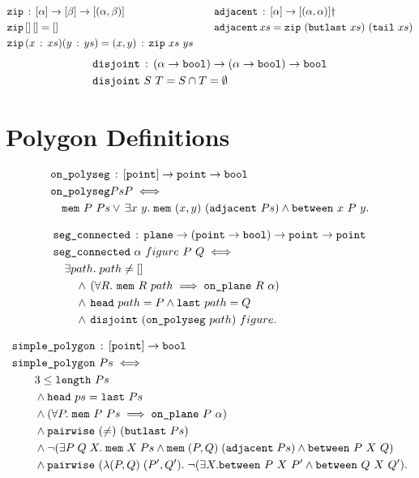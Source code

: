 \begin{align*}
  & \code{zip}\,:\,[\alpha]\rightarrow[\beta]\rightarrow[(\alpha,\beta)] &\quad
  & \code{adjacent}\,:\,[\alpha]\rightarrow[(\alpha,\alpha)]\dag\\
  & \code{zip}\,[]\,[] = [] &\quad
  & \code{adjacent}\,xs = \code{zip}\ (\code{butlast}\ xs)\ (\code{tail}\ xs)\\
  & \code{zip}\,(\cons{x}{xs})(\cons{y}{ys}) = \cons{(x,y)}{\code{zip}\ xs\ ys}
\end{align*}
\begin{align*}
  & \texttt{disjoint}\,:\,(\alpha\rightarrow\texttt{bool})\rightarrow(\alpha\rightarrow\texttt{bool})\rightarrow\texttt{bool}\\
  & \texttt{disjoint}\ S\ T = S \cap T = \emptyset
\end{align*}

\section{Polygon Definitions}
\begin{align*}
  &\code{on\_polyseg}\,:\,[\code{point}] \rightarrow \code{point} \rightarrow \code{bool}\\
  &\code{on\_polyseg}{Ps}{P} \iff\\
  &\quad\code{mem}\ P\ Ps\vee\,\exists x\ y.\; \code{mem}\ (x,y)\ (\code{adjacent}\ Ps) \wedge \between{x}{P}{y}.
\end{align*}

\begin{align*}
  &\code{seg\_connected}\,:\,\code{plane}\rightarrow(\code{point} \rightarrow \code{bool}) \rightarrow    \code{point} \rightarrow \code{point}\\
  &\code{seg\_connected}\ \alpha\ figure\ P\ Q \iff\\
  &\quad\exists path.\; path \neq []\\
  &\qquad\wedge\,(\forall R.\ \code{mem}\ R\ path \implies \onplane{R}{\alpha})\\
  &\qquad\wedge\,\code{head}\ path = P \wedge \code{last}\ path = Q\\
  &\qquad\wedge\,\code{disjoint}\ (\code{on\_polyseg}\ path)\ figure.
\end{align*}

\begin{align*}
  &\code{simple\_polygon}\,:\,[\code{point}] \rightarrow \code{bool}\\
  &\code{simple\_polygon}\ Ps \iff \\
  &\qquad 3 \leq \code{length}\ Ps\\
  &\qquad\wedge \code{head}\ ps = \code{last}\ Ps\\
  &\qquad\wedge (\forall P.\;\code{mem}\ P\ Ps \implies \code{on\_plane}\ P\ \alpha)\\
  &\qquad\wedge \code{pairwise}\ (\neq)\ (\code{butlast}\ Ps)\\
  &\qquad\wedge \neg(\exists P\;Q\;X.\; \code{mem}\;X\;Ps\wedge\code{mem}\;(P,Q)\;(\code{adjacent}\;Ps)\wedge\between{P}{X}{Q})\\
  &\qquad\wedge \code{pairwise}\ (\lambda(P,Q)\;(P',Q').\;\neg(\exists X. \between{P}{X}{P'} \wedge \between{Q}{X}{Q'}).
\end{align*}

